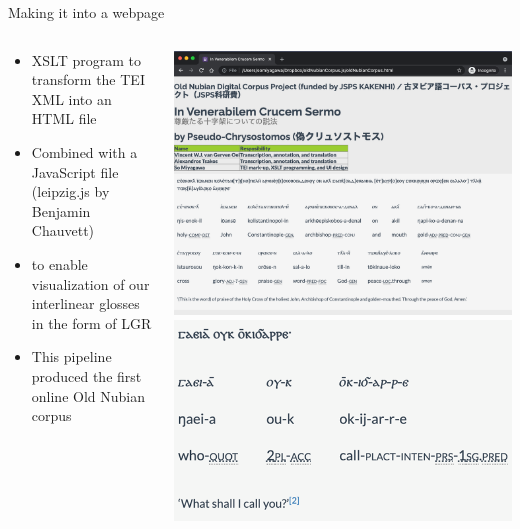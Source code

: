 \documentclass{beamer}
\begin{document}
\begin{frame}{Making it into a webpage}
  \begin{columns}
    \begin{column}{0.6\textwidth}
  \begin{itemize}
    \item XSLT program to transform the TEI XML into an HTML file 
    \item Combined with a JavaScript file (leipzig.js by Benjamin Chauvett) 
    \item to enable visualization of our interlinear glosses in the form of LGR 
    \item This pipeline produced the first online Old Nubian corpus
  \end{itemize}

    \end{column}
    \begin{column}{0.4\textwidth}
    \begin{center}
\includegraphics[width=1.0\textwidth]{webcorpus.png} 
\\
       \includegraphics[width=1.0\textwidth]{webpage.png}
\end{center}

    \end{column}
\end{columns}



\end{frame}
 
\end{document}
